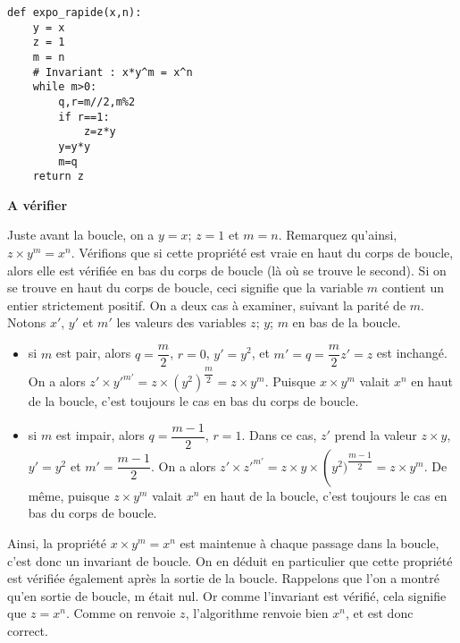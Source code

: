 \begin{lstlisting}
def expo_rapide(x,n):
    y = x
    z = 1
    m = n
    # Invariant : x*y^m = x^n
    while m>0:
        q,r=m//2,m%2
        if r==1:
            z=z*y
        y=y*y
        m=q
    return z
\end{lstlisting}

\ifprof
\begin{corrige}
\textbf{A vérifier}

Juste avant la boucle, on a $y = x$; $z = 1$ et $m = n$. Remarquez qu’ainsi, $z\times y^m = x^n$. Vérifions que si cette propriété est vraie en haut du corps de boucle, alors elle est vérifiée en bas du corps de boucle
(là où se trouve le second). Si on se trouve en haut du corps de boucle, ceci signifie que la variable $m$ contient un entier
strictement positif. On a deux cas à examiner, suivant la parité de $m$. Notons $x'$, $y'$ et $m'$ les valeurs des variables
$z$; $y$; $m$ en bas de la boucle.
\begin{itemize}
\item si $m$ est pair, alors $q = \dfrac{m}{2}$, $r=0$, $y'=y^2$, et $m'=q=\dfrac{m}{2}z'=z$ est inchangé. On a alors
$z'\times y'^{m'}=z\times \left(y^2\right)^{\dfrac{m}{2}} = z\times y^m$. Puisque $x\times y^m$ valait $x^n$ en haut de la boucle, c’est toujours le cas en bas du corps de boucle.
\item si $m$ est impair, alors $q=\dfrac{m-1}{2}$, $r=1$. Dans ce cas, $z'$ prend la valeur $z\times y$, $y'=y^2$ et 
$m'=\dfrac{m-1}{2}$. On a alors $z' \times z'^{m'} = z\times y \times \left(y^2)^{\dfrac{m-1}{2}}  = z\times y^m$.
De même, puisque $z\times y^m$ valait $x^n$ en haut de la boucle, c’est toujours le cas en bas du corps de boucle.
\end{itemize}
Ainsi, la propriété $x\times y^m = x^n$ est maintenue à chaque passage dans la boucle, c’est donc un invariant de boucle.
On en déduit en particulier que cette propriété est vérifiée également après la sortie de la boucle. Rappelons que l’on
a montré qu’en sortie de boucle, m était nul. Or comme l’invariant est vérifié, cela signifie que $z=x^n$. Comme on renvoie $z$, l'algorithme renvoie bien $x^n$, et est donc correct.
\end{corrige}
\else
\fi